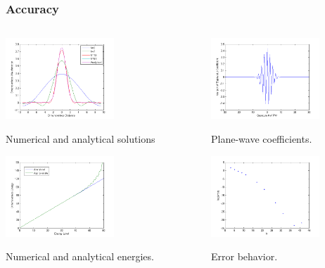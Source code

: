 \documentclass[]{beamer}
\begin{document}
\begin{frame}
  \frametitle{Accuracy}  

  \begin{columns}
  
  \begin{column}{0.5\textwidth}
  \centering
  
  \includegraphics[height=1.2in]{a1.png}
    
  Numerical and analytical solutions

  \pause
  \includegraphics[height=1.2in]{a2.png}
  
  Numerical and analytical energies.

  \end{column}
  
  \begin{column}{0.5\textwidth}
  \centering
  
  \pause
  \includegraphics[height=1.2in]{a3.png}
  
  Plane-wave coefficients.
    
  \pause  
  \includegraphics[height=1.2in]{a4.png}
  
  Error behavior.
  \end{column}
  
  \end{columns}
  
\end{frame}
\end{document}
